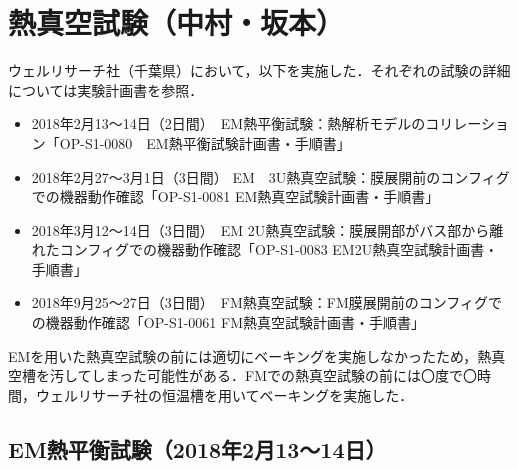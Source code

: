 \section{熱真空試験（中村・坂本）}

ウェルリサーチ社（千葉県）において，以下を実施した．それぞれの試験の詳細については実験計画書を参照．

\begin{itemize}
	\item 2018年2月13～14日（2日間）　EM熱平衡試験：熱解析モデルのコリレーション「OP-S1-0080　EM熱平衡試験計画書・手順書」
	\item 2018年2月27～3月1日（3日間） EM　3U熱真空試験：膜展開前のコンフィグでの機器動作確認「OP-S1-0081 EM熱真空試験計画書・手順書」
	\item 2018年3月12～14日（3日間）　EM 2U熱真空試験：膜展開部がバス部から離れたコンフィグでの機器動作確認「OP-S1-0083 EM2U熱真空試験計画書・手順書」
	\item 2018年9月25～27日（3日間）　FM熱真空試験：FM膜展開前のコンフィグでの機器動作確認「OP-S1-0061 FM熱真空試験計画書・手順書」
\end{itemize}

EMを用いた熱真空試験の前には適切にベーキングを実施しなかったため，熱真空槽を汚してしまった可能性がある．FMでの熱真空試験の前には〇度で〇時間，ウェルリサーチ社の恒温槽を用いてベーキングを実施した．

\subsection{EM熱平衡試験（2018年2月13～14日）}


